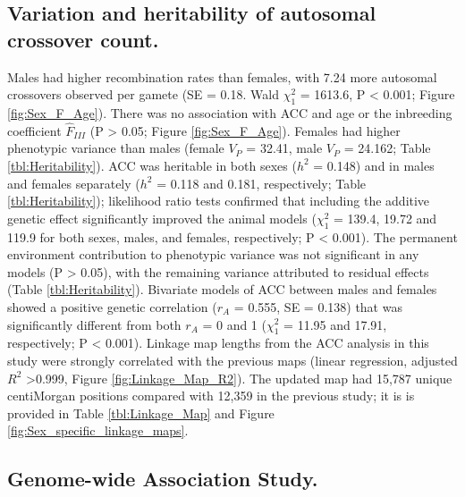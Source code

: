 \documentclass[a4paper,11pt]{article}
\begin{document}
\subsection*{Variation and heritability of autosomal crossover count.}
Males had higher recombination rates than females, with 7.24 more autosomal crossovers observed per gamete (SE = 0.18. Wald $\chi^{2}_{1}$ = 1613.6, P < 0.001; Figure \ref{fig:Sex_F_Age}). There was no association with ACC and age or the inbreeding coefficient $\hat{F}_{III}$ (P > 0.05; Figure \ref{fig:Sex_F_Age}). Females had higher phenotypic variance than males (female $V_{P}$ = 32.41, male $V_{P}$ = 24.162; Table \ref{tbl:Heritability}). ACC was heritable in both sexes ($h^{2}$ = 0.148) and in males and females separately ($h^{2}$ = 0.118 and 0.181, respectively; Table \ref{tbl:Heritability}); likelihood ratio tests confirmed that including the additive genetic effect significantly improved the animal models ($\chi^{2}_{1}$ = 139.4, 19.72 and 119.9 for both sexes, males, and females, respectively; P < 0.001). The permanent environment contribution to phenotypic variance was not significant in any models (P > 0.05), with the remaining variance attributed to residual effects (Table \ref{tbl:Heritability}). Bivariate models of ACC between males and females showed a positive genetic correlation ($r_{A}$ = 0.555, SE = 0.138) that was significantly different from both $r_{A}$ = 0 and 1 ($\chi^{2}_{1}$ = 11.95 and 17.91, respectively; P < 0.001). Linkage map lengths from the ACC analysis in this study were strongly correlated with the previous maps (linear regression, adjusted $R^{2}$ \textgreater 0.999, Figure \ref{fig:Linkage_Map_R2}). The updated map had 15,787 unique centiMorgan positions compared with 12,359 in the previous study; it is is provided in Table \ref{tbl:Linkage_Map} and Figure \ref{fig:Sex_specific_linkage_maps}. 



\subsection*{Genome-wide Association Study.}
\end{document}
